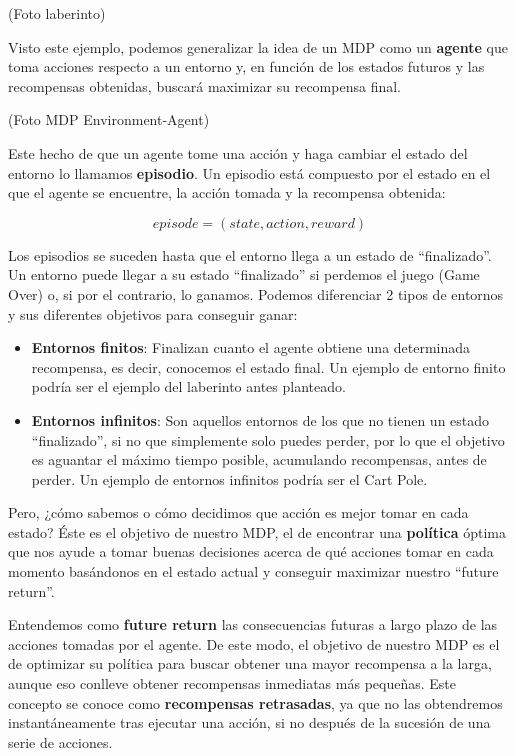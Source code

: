 (Foto laberinto)

Visto este ejemplo, podemos generalizar la idea de un MDP como un \textbf{agente} que toma acciones respecto a un entorno y, en función de los estados futuros y las recompensas obtenidas, buscará maximizar su recompensa final.

(Foto MDP Environment-Agent)

Este hecho de que un agente tome una acción y haga cambiar el estado del entorno lo llamamos \textbf{episodio}. Un episodio está compuesto por el estado en el que el agente se encuentre, la acción tomada y la recompensa obtenida:

\begin{equation}
    episode = (state, action, reward)
\end{equation}

Los episodios se suceden hasta que el entorno llega a un estado de “finalizado”. Un entorno puede llegar a su estado “finalizado” si perdemos el juego (Game Over) o, si por el contrario, lo ganamos. Podemos diferenciar 2 tipos de entornos y sus diferentes objetivos para conseguir ganar:

\begin{itemize}
    \item \textbf{Entornos finitos}: Finalizan cuanto el agente obtiene una determinada recompensa, es decir, conocemos el estado final. Un ejemplo de entorno finito podría ser el ejemplo del laberinto antes planteado.
    \item \textbf{Entornos infinitos}: Son aquellos entornos de los que no tienen un estado “finalizado”, si no que simplemente solo puedes perder, por lo que el objetivo es aguantar el máximo tiempo posible, acumulando recompensas, antes de perder. Un ejemplo de entornos infinitos podría ser el Cart Pole.
\end{itemize}

Pero, ¿cómo sabemos o cómo decidimos que acción es mejor tomar en cada estado? Éste es el objetivo de nuestro MDP, el de encontrar una \textbf{política} óptima que nos ayude a tomar buenas decisiones acerca de qué acciones tomar en cada momento basándonos en el estado actual y conseguir maximizar nuestro “future return”.

Entendemos como \textbf{future return} las consecuencias futuras a largo plazo de las acciones tomadas por el agente. De este modo, el objetivo de nuestro MDP es el de optimizar su política para buscar obtener una mayor recompensa a la larga, aunque eso conlleve obtener recompensas inmediatas más pequeñas. Este concepto se conoce como \textbf{recompensas retrasadas}, ya que no las obtendremos instantáneamente tras ejecutar una acción, si no después de la sucesión de una serie de acciones.

